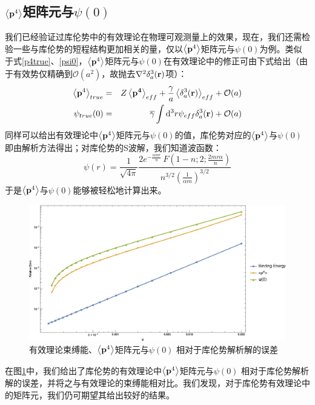 \documentclass[cs4size,titlepage,twoside]{ctexart}
\begin{document}
\subsection{$\expval{\vb{p}^4}$矩阵元与$\psi(0)$}
我们已经验证过库伦势中的有效理论在物理可观测量上的效果，现在，我们还需检验一些与库伦势的短程结构更加相关的量，仅以$\expval{\vb{p}^4}$矩阵元与$\psi(0)$为例。类似于式\eqref{p4true}、\eqref{psi0}，$\expval{\vb{p}^4}$矩阵元与$\psi(0)$在有效理论中的修正可由下式给出（由于有效势仅精确到$\mathcal{O}(a^2)$，故抛去$\laplacian{\delta^3_a(\vb{r})}$项）：
\begin{eqnarray}
	\expval{\vb{p}^4}_{true}&=&Z\expval{\vb{p^4}}_{eff}+\frac{\gamma}{a}\expval{\delta^3_a(\vb{r})}_{eff}+\mathcal{O}(a)\\
	\psi_{true}(0)&=&\overline{\gamma}\int\dd^3r\psi_{eff}\delta^3_a(\vb{r})+\mathcal{O}(a)
\end{eqnarray}
同样可以给出有效理论中$\expval{\vb{p}^4}$矩阵元与$\psi(0)$的值，库伦势对应的$\expval{\vb{p}^4}$与$\psi(0)$即由解析方法得出；对库伦势的S波解，我们知道波函数：
\begin{equation*}
	\psi(r) = \frac{1}{\sqrt{4\pi}}\frac{2 e^{-\frac{\alpha  m r}{n}} \, F\left(1-n;2;\frac{2 m r \alpha }{n}\right)}{n^{3/2} \left(\frac{1}{\alpha  m}\right)^{3/2}}
\end{equation*}
于是$\expval{\vb{p}^4}$与$\psi(0)$能够被轻松地计算出来。
\begin{figure}[!htbp]
	\centering
	\includegraphics[width=6in]{Test_Coulomb_7.eps}
	\caption{有效理论束缚能、$\expval{\vb{p}^4}$矩阵元与$\psi(0)$ 相对于库伦势解析解的误差}\label{melCV}
\end{figure}
在图\ref{melCV}中，我们给出了库伦势的有效理论中$\expval{\vb{p}^4}$矩阵元与$\psi(0)$ 相对于库伦势解析解的误差，并将之与有效理论的束缚能相对比。我们发现，对于库伦势有效理论中的矩阵元，我们仍可期望其给出较好的结果。
\end{document}
